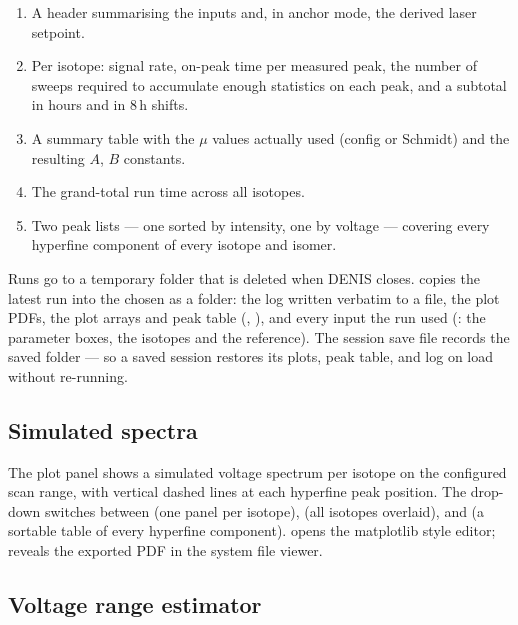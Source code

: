 \begin{enumerate}
    \item A header summarising the inputs and, in anchor mode, the
        derived laser setpoint.
    \item Per isotope: signal rate, on-peak time per measured peak,
        the number of sweeps required to accumulate enough statistics
        on each peak, and a subtotal in hours and in 8\,h shifts.
    \item A  summary table with the $\mu$
        values actually used (config or Schmidt) and the resulting
        $A$, $B$ constants.
    \item The grand-total run time across all isotopes.
    \item Two peak lists --- one sorted by intensity, one by voltage
        --- covering every hyperfine component of every isotope and
        isomer.
\end{enumerate}

Runs go to a temporary folder that is deleted when DENIS closes.
 copies the latest run into the chosen 
as a  folder: the log written verbatim to a
 file, the plot PDFs, the plot arrays and peak table
(, ), and every input the
run used (: the parameter boxes, the
isotopes and the reference). The session save
file records the saved folder --- so a saved session restores its
plots, peak table, and log on load without re-running.

\subsection{Simulated spectra}

The plot panel shows a simulated voltage spectrum per isotope on the
configured scan range, with vertical dashed lines at each hyperfine
peak position. The
 drop-down switches between  (one
panel per isotope),  (all isotopes overlaid),
and  (a sortable table of every hyperfine component).
 opens the matplotlib style editor; 
reveals the exported PDF in the system file viewer.

\subsection{Voltage range estimator}

